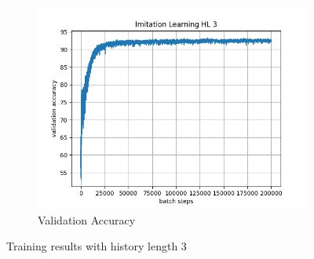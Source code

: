 \documentclass[10pt]{scrartcl}
\begin{document}
\begin{figure}[h]
\begin{subfigure}{0.5\textwidth}
      \includegraphics[width=\linewidth]{images/Il_hl3_valid.png}
      \caption{Validation Accuracy}
      \label{fig:Il_hl3_valid}
    \end{subfigure}
    \caption{Training results with history length 3}
    \label{fig:Il_hl3}
\end{figure}
\end{document}
